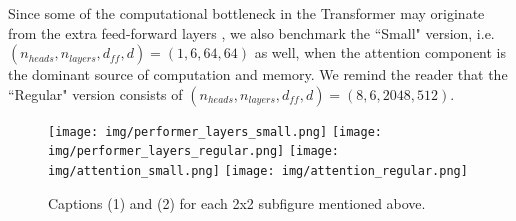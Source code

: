 Since some of the computational bottleneck in the Transformer may originate from the extra feed-forward layers \citep{reformer}, we also benchmark the ``Small" version, i.e. $(n_{heads}, n_{layers}, d_{ff}, d) = (1,6,64,64)$ as well, when the attention component is the dominant source of computation and memory. We remind the reader that the ``Regular" version consists of  $(n_{heads}, n_{layers}, d_{ff}, d) = (8,6,2048,512)$. 

\vspace{0.1cm}
\label{appendix:computation_costs_bidirectional}

\begin{comment}
\begin{figure}
  \texttt{[image: img/performer\_layers\_small.png]}
  \texttt{[image: img/performer\_layers\_regular.png]}
  \caption{Varying layers when using Performer. We show that our method can scale up to (but not necessarily limited to) even 20 layers.}
  \label{fig:appendix_layers}
\end{figure}


\begin{figure}
  \texttt{[image: img/attention\_small.png]}
  \texttt{[image: img/attention\_regular.png]}
  \caption{Attention time complexities when comparing standard attention (from Transformer) and FAVOR (from Performer). Note that the maximum memory size here is not reflective of the maximum memory size in an actual model (shown below), as this benchmark requires computing explicit tensors (causing memory increases) in Jax, while a model does not.}
  \label{fig:appendix_attention}
\end{figure}


\begin{figure}
  \texttt{[image: img/model\_small\_opt.png]}
  \texttt{[image: img/model\_regular\_opt.png]}
  \caption{Time complexities when comparing the Transformer and Performer models. "X" (OPT) denotes the maximum possible speedup achievable, when attention simply returns the $\mathbf{V}$-vector, showing that the Performer is nearly optimal. We see that the maximum possible length allowed on a V100 GPU (16GB) is $2^{15} = 32768$ using regular dimensions.}
  \label{fig:appendix_transformer}
\end{figure}
\end{comment}


\begin{figure}[h]
  \texttt{[image: img/performer\_layers\_small.png]}
  \texttt{[image: img/performer\_layers\_regular.png]}
  \texttt{[image: img/attention\_small.png]}
  \texttt{[image: img/attention\_regular.png]}

  \caption{Captions (1) and (2) for each 2x2 subfigure mentioned above.}
  \label{fig:appendix_runtime}
\end{figure}

